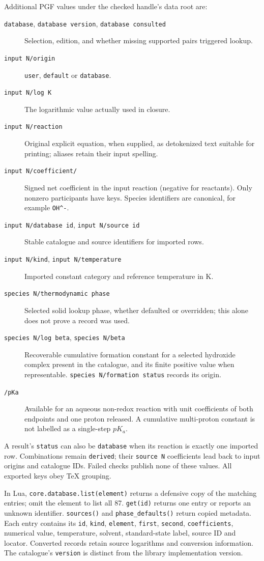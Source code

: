 \documentclass[a4paper,11pt]{ltxdoc}
\begin{document}
Additional PGF values under the checked handle's data root are:
\begin{description}
  \item[\texttt{database}, \texttt{database version}, \texttt{database consulted}]
    Selection, edition, and whether missing supported pairs triggered lookup.
  \item[\texttt{input N/origin}] \texttt{user}, \texttt{default} or \texttt{database}.
  \item[\texttt{input N/log K}] The logarithmic value actually used in closure.
  \item[\texttt{input N/reaction}] Original explicit equation, when supplied,
    as detokenized text suitable for printing; aliases retain their input spelling.
  \item[\texttt{input N/coefficient/}] Signed net coefficient
    in the input reaction (negative for reactants). Only nonzero participants
    have keys. Species identifiers are canonical, for example \verb|OH^-|.
  \item[\texttt{input N/database id}, \texttt{input N/source id}]
    Stable catalogue and source identifiers for imported rows.
  \item[\texttt{input N/kind}, \texttt{input N/temperature}]
    Imported constant category and reference temperature in K.
  \item[\texttt{species N/thermodynamic phase}] Selected solid lookup phase,
    whether defaulted or overridden; this alone does not prove a record was used.
  \item[\texttt{species N/log beta}, \texttt{species N/beta}]
    Recoverable cumulative formation constant for a selected hydroxide complex
    present in the catalogue, and its finite positive value when representable.
    \texttt{species N/formation status} records its origin.
  \item[\texttt{/pKa}] Available for an aqueous non-redox reaction
    with unit coefficients of both endpoints and one proton released. A
    cumulative multi-proton constant is not labelled as a single-step $pK_a$.
\end{description}
A result's \texttt{status} can also be \texttt{database} when its reaction
is exactly one imported row. Combinations remain \texttt{derived}; their
\texttt{source N} coefficients lead back to input origins and catalogue IDs.
Failed checks publish none of these values. All exported keys obey TeX grouping.

In Lua, \texttt{core.database.list(element)} returns a defensive copy of the
matching entries; omit the element to list all 87. \texttt{get(id)} returns one
entry or reports an unknown identifier. \texttt{sources()} and
\texttt{phase\_defaults()} return copied metadata. Each entry contains its
\texttt{id}, \texttt{kind}, \texttt{element}, \texttt{first}, \texttt{second},
\texttt{coefficients}, numerical value, temperature, solvent, standard-state
label, source ID and locator. Converted records retain source logarithms and
conversion information. The catalogue's \texttt{version} is distinct from the
library implementation version.
\end{document}
